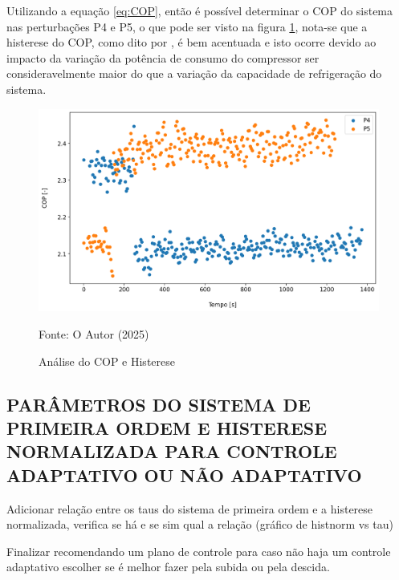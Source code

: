 Utilizando a equação \ref{eq:COP}, então é possível determinar o COP do sistema nas perturbações P4 e P5, o que pode ser visto na figura \ref{fig:Análise do COP Histerese}, nota-se que a histerese do COP, como dito por \textcite{MASCHE2021302}, é bem acentuada e isto ocorre devido ao impacto da variação da potência de consumo do compressor ser consideravelmente maior do que a variação da capacidade de refrigeração do sistema.  
\newpage
\begin{figure}[h]
    \centering
    \includegraphics[width=1\linewidth]{FigurasdoTexto/COP Histerese.png}
    \caption{Análise do COP e Histerese}
    \label{fig:Análise do COP Histerese}
    {\footnotesize Fonte: O Autor (2025)}
\end{figure}

\subsection{\MakeUppercase{Parâmetros do Sistema de Primeira Ordem e Histerese Normalizada para Controle Adaptativo ou Não Adaptativo}}


Adicionar relação entre os taus do sistema de primeira ordem e a histerese normalizada, verifica se há e se sim qual a relação (gráfico de histnorm vs tau)

Finalizar recomendando um plano de controle para caso não haja um controle adaptativo escolher se é melhor fazer pela subida ou pela descida.